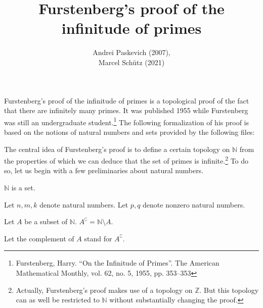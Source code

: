 \documentclass{article}
\title{Furstenberg's proof of the infinitude of primes}
\author{Andrei Paskevich (2007), \\
Marcel Schütz (2021)}
\date{}
\begin{document}
  \maketitle

  Furstenberg's proof of the infinitude of primes is a topological proof of the
  fact that there are infinitely many primes.
  It was published 1955 while Furstenberg was still an undergraduate
  student.\footnote{Furstenberg, Harry. \enquote{On the Infinitude of Primes}.
  The American Mathematical Monthly, vol. 62, no. 5, 1955, pp. 353–353}
  The following formalization of his proof is based on the notions of natural
  numbers and sets provided by the following files:

  \begin{forthel}
  \end{forthel}

  \begin{forthel}
  \end{forthel}

  \begin{forthel}
  \end{forthel}

  The central idea of Furstenberg's proof is to define a certain topology on
  $\mathbb{N}$ from the properties of which we can deduce that the set of
  primes is infinite.\footnote{Actually, Furstenberg's proof makes use of a
  topology on $\mathbb{Z}$. But this topology can as well be restricted to
  $\mathbb{N}$ without substantially changing the proof.}
  To do so, let us begin with a few preliminaries about natural numbers.

  \begin{forthel}
    \begin{axiom}
      $\mathbb{N}$ is a set.
    \end{axiom}

    Let $n,m,k$ denote natural numbers.
    Let $p,q$ denote nonzero natural numbers.

    \begin{definition}
      Let $A$ be a subset of $\mathbb{N}$.
      $A^{\complement} = \mathbb{N} \setminus A$.
    \end{definition}

    Let the complement of $A$ stand for $A^{\complement}$.
  \end{forthel}
\end{document}
